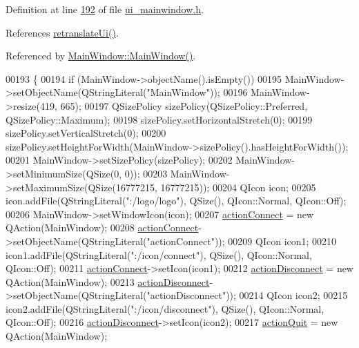 Definition at line \hyperlink{a00139_source_l00192}{192} of file \hyperlink{a00139_source}{ui\+\_\+mainwindow.\+h}.



References \hyperlink{a00139_source_l01867}{retranslate\+Ui()}.



Referenced by \hyperlink{a00109_source_l00024}{Main\+Window\+::\+Main\+Window()}.


\begin{DoxyCode}
00193     \{
00194         \textcolor{keywordflow}{if} (MainWindow->objectName().isEmpty())
00195             MainWindow->setObjectName(QStringLiteral(\textcolor{stringliteral}{"MainWindow"}));
00196         MainWindow->resize(419, 665);
00197         QSizePolicy sizePolicy(QSizePolicy::Preferred, QSizePolicy::Maximum);
00198         sizePolicy.setHorizontalStretch(0);
00199         sizePolicy.setVerticalStretch(0);
00200         sizePolicy.setHeightForWidth(MainWindow->sizePolicy().hasHeightForWidth());
00201         MainWindow->setSizePolicy(sizePolicy);
00202         MainWindow->setMinimumSize(QSize(0, 0));
00203         MainWindow->setMaximumSize(QSize(16777215, 16777215));
00204         QIcon icon;
00205         icon.addFile(QStringLiteral(\textcolor{stringliteral}{":/logo/logo"}), QSize(), QIcon::Normal, QIcon::Off);
00206         MainWindow->setWindowIcon(icon);
00207         \hyperlink{a00080_aa0785566311fc48271690fb68b1d4c5f}{actionConnect} = \textcolor{keyword}{new} QAction(MainWindow);
00208         \hyperlink{a00080_aa0785566311fc48271690fb68b1d4c5f}{actionConnect}->setObjectName(QStringLiteral(\textcolor{stringliteral}{"actionConnect"}));
00209         QIcon icon1;
00210         icon1.addFile(QStringLiteral(\textcolor{stringliteral}{":/icon/connect"}), QSize(), QIcon::Normal, QIcon::Off);
00211         \hyperlink{a00080_aa0785566311fc48271690fb68b1d4c5f}{actionConnect}->setIcon(icon1);
00212         \hyperlink{a00080_a8a16b3aef75b279eaaa887152d2f746b}{actionDisconnect} = \textcolor{keyword}{new} QAction(MainWindow);
00213         \hyperlink{a00080_a8a16b3aef75b279eaaa887152d2f746b}{actionDisconnect}->setObjectName(QStringLiteral(\textcolor{stringliteral}{"actionDisconnect"}));
00214         QIcon icon2;
00215         icon2.addFile(QStringLiteral(\textcolor{stringliteral}{":/icon/disconnect"}), QSize(), QIcon::Normal, QIcon::Off);
00216         \hyperlink{a00080_a8a16b3aef75b279eaaa887152d2f746b}{actionDisconnect}->setIcon(icon2);
00217         \hyperlink{a00080_a188c243f36a2dbc10e4e2a0ad94273b1}{actionQuit} = \textcolor{keyword}{new} QAction(MainWindow);

\end{DoxyCode}
